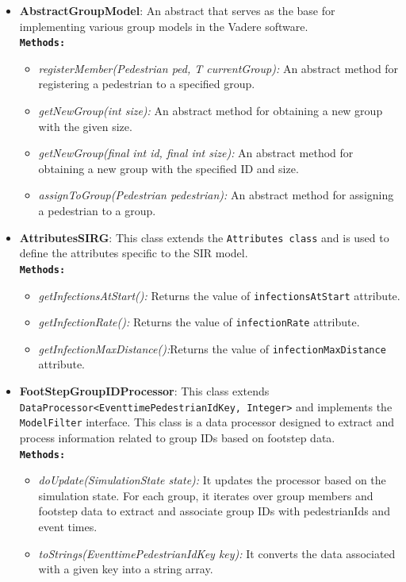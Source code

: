 \begin{itemize}
\item \textbf{AbstractGroupModel}: An abstract that serves as the base for implementing various group models in the Vadere software. \\
\textbf{\texttt{{Methods:}}}
\begin{itemize}
    \item \textit{registerMember(Pedestrian ped, T currentGroup):} An abstract method for registering a pedestrian to a specified group.
    \item \textit{getNewGroup(int size):} An abstract method for obtaining a new group with the given size.
    \item \textit{getNewGroup(final int id, final int size):} An abstract method for obtaining a new group with the specified ID and size.
    \item \textit{assignToGroup(Pedestrian pedestrian):} An abstract method for assigning a pedestrian to a group.
\end{itemize}

\item \textbf{AttributesSIRG}: This class extends the \texttt{Attributes class} and is used to define the attributes specific to the SIR model. \\
\textbf{\texttt{{Methods:}}}
\begin{itemize}
    \item \textit{getInfectionsAtStart():} Returns the value of \texttt{infectionsAtStart} attribute.
    \item \textit{getInfectionRate():} Returns the value of \texttt{infectionRate} attribute.
    \item \textit{getInfectionMaxDistance():}Returns the value of \texttt{infectionMaxDistance} attribute.
\end{itemize}

\item \textbf{FootStepGroupIDProcessor}: This class extends \texttt{DataProcessor<EventtimePedestrianIdKey, Integer>} and implements the \texttt{ModelFilter} interface. This class is a data processor designed to extract and process information related to group IDs based on footstep data. \\
\textbf{\texttt{{Methods:}}}
\begin{itemize}
    \item \textit{doUpdate(SimulationState state):} It updates the processor based on the simulation state. For each group, it iterates over group members and footstep data to extract and associate group IDs with pedestrianIds and event times.
    \item \textit{toStrings(EventtimePedestrianIdKey key):} It converts the data associated with a given key into a string array.
\end{itemize}


\end{itemize}
